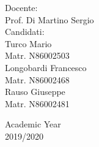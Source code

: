 \begin{center}
\begin{multicols}{2}
	{\large Docente:\\}
	Prof. Di Martino Sergio\\
	\vspace{10mm}
	\columnbreak
	{\large Candidati:\\}
	Turco Mario\\
	Matr. N86002503\\
	Longobardi Francesco\\
	Matr. N86002468\\
	Rauso Giuseppe\\
	Matr. N86002481
	\vspace{10mm}
\end{multicols}

\vfill

{\large Academic Year\\ 2019/2020}

\end{center}



%
%
\newpage
\openright
{\hypersetup{hidelinks}
\tableofcontents
}


%
%


